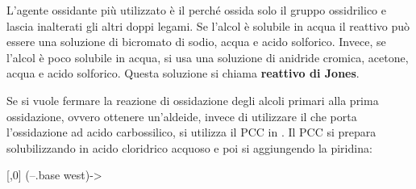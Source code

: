 L'agente ossidante più utilizzato è il  perché ossida solo il gruppo ossidrilico e lascia inalterati gli altri doppi legami. Se l'alcol è solubile in acqua il reattivo può essere una soluzione di bicromato di sodio, acqua e acido solforico. Invece, se l’alcol è poco solubile in acqua, si usa una soluzione di anidride cromica, acetone, acqua e acido solforico. Questa soluzione si chiama \textbf{reattivo di Jones}.

Se si vuole fermare la reazione di ossidazione degli alcoli primari alla prima ossidazione, ovvero ottenere un'aldeide, invece di utilizzare il  che porta l'ossidazione ad acido carbossilico, si utilizza il \ac{PCC} in . Il \ac*{PCC} si prepara solubilizzando  in acido cloridrico acquoso e poi si aggiungendo la piridina:
\begin{reaction}
	 \+  \+ [,0] 
	\arrow(--.base west){->}
\end{reaction}